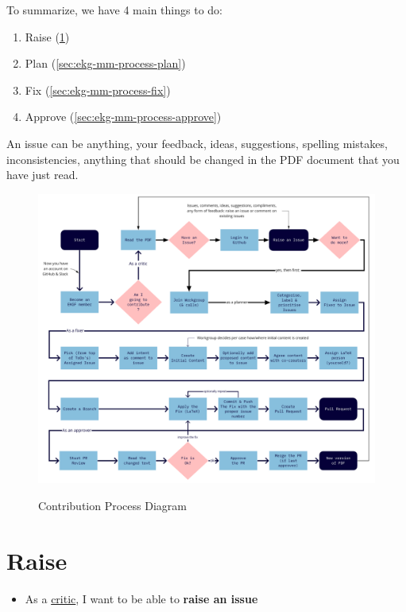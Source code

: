 To summarize, we have 4 main things to do:

\begin{enumerate}
    \item Raise (\ref{sec:ekg-mm-process-raise})
    \item Plan (\ref{sec:ekg-mm-process-plan})
    \item Fix (\ref{sec:ekg-mm-process-fix})
    \item Approve (\ref{sec:ekg-mm-process-approve})
\end{enumerate}

An issue can be anything, your feedback, ideas, suggestions, spelling mistakes,
inconsistencies, anything that should be changed in the PDF document that you have just read.

\begin{figure}[ht]
    \centering
    \caption{Contribution Process Diagram}
    \includegraphics[width=\textwidth]{../images/ekgmm-process-diagram.pdf}
    \label{fig:ekg-mm-process-diagram}
\end{figure}

\section{Raise}
\label{sec:ekg-mm-process-raise}

\begin{tcolorbox}[colback=secondary!5,colframe=secondary!80,title=\textbf{User Stories}]
    \begin{itemize}[leftmargin=1em]
        \item As a \underline{critic}, I want to be able to \textbf{raise an issue}
    \end{itemize}
\end{tcolorbox}

